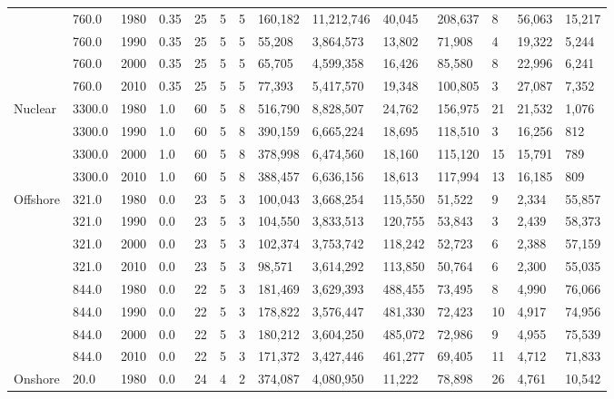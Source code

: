 \begin{table}[]
\begin{tabular}{|l|l|l|l|l|l|l|l|l|l|l|l|l|l|}
		& 760.0 & 1980 & 0.35 & 25 & 5 & 5 & 160,182 & 11,212,746 & 40,045 & 208,637 & 8 & 56,063 & 15,217 \\ \cline{2-14} 
		& 760.0 & 1990 & 0.35 & 25 & 5 & 5 & 55,208 & 3,864,573 & 13,802 & 71,908 & 4 & 19,322 & 5,244 \\ \cline{2-14} 
		& 760.0 & 2000 & 0.35 & 25 & 5 & 5 & 65,705 & 4,599,358 & 16,426 & 85,580 & 8 & 22,996 & 6,241 \\ \cline{2-14} 
		& 760.0 & 2010 & 0.35 & 25 & 5 & 5 & 77,393 & 5,417,570 & 19,348 & 100,805 & 3 & 27,087 & 7,352 \\ \hline
		\multirow{4}{*}{Nuclear} & 3300.0 & 1980 & 1.0 & 60 & 5 & 8 & 516,790 & 8,828,507 & 24,762 & 156,975 & 21 & 21,532 & 1,076 \\ \cline{2-14} 
		& 3300.0 & 1990 & 1.0 & 60 & 5 & 8 & 390,159 & 6,665,224 & 18,695 & 118,510 & 3 & 16,256 & 812 \\ \cline{2-14} 
		& 3300.0 & 2000 & 1.0 & 60 & 5 & 8 & 378,998 & 6,474,560 & 18,160 & 115,120 & 15 & 15,791 & 789 \\ \cline{2-14} 
		& 3300.0 & 2010 & 1.0 & 60 & 5 & 8 & 388,457 & 6,636,156 & 18,613 & 117,994 & 13 & 16,185 & 809 \\ \hline
		\multirow{8}{*}{Offshore} & 321.0 & 1980 & 0.0 & 23 & 5 & 3 & 100,043 & 3,668,254 & 115,550 & 51,522 & 9 & 2,334 & 55,857 \\ \cline{2-14} 
		& 321.0 & 1990 & 0.0 & 23 & 5 & 3 & 104,550 & 3,833,513 & 120,755 & 53,843 & 3 & 2,439 & 58,373 \\ \cline{2-14} 
		& 321.0 & 2000 & 0.0 & 23 & 5 & 3 & 102,374 & 3,753,742 & 118,242 & 52,723 & 6 & 2,388 & 57,159 \\ \cline{2-14} 
		& 321.0 & 2010 & 0.0 & 23 & 5 & 3 & 98,571 & 3,614,292 & 113,850 & 50,764 & 6 & 2,300 & 55,035 \\ \cline{2-14} 
		& 844.0 & 1980 & 0.0 & 22 & 5 & 3 & 181,469 & 3,629,393 & 488,455 & 73,495 & 8 & 4,990 & 76,066 \\ \cline{2-14} 
		& 844.0 & 1990 & 0.0 & 22 & 5 & 3 & 178,822 & 3,576,447 & 481,330 & 72,423 & 10 & 4,917 & 74,956 \\ \cline{2-14} 
		& 844.0 & 2000 & 0.0 & 22 & 5 & 3 & 180,212 & 3,604,250 & 485,072 & 72,986 & 9 & 4,955 & 75,539 \\ \cline{2-14} 
		& 844.0 & 2010 & 0.0 & 22 & 5 & 3 & 171,372 & 3,427,446 & 461,277 & 69,405 & 11 & 4,712 & 71,833 \\ \hline
		\multirow{4}{*}{Onshore} & 20.0 & 1980 & 0.0 & 24 & 4 & 2 & 374,087 & 4,080,950 & 11,222 & 78,898 & 26 & 4,761 & 10,542 \\ \cline{2-14} 

\end{tabular}
\end{table}
